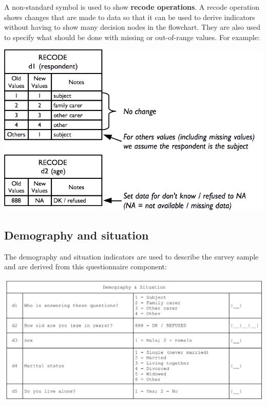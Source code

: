 \documentclass[12pt,a4paper]{book}
\theoremstyle{definition}
\theoremstyle{definition}
\theoremstyle{definition}
\theoremstyle{remark}
\begin{document}
A non-standard symbol is used to show \textbf{recode operations}. A
recode operation shows changes that are made to data so that it can be
used to derive indicators without having to show many decision nodes in
the flowchart. They are also used to specify what should be done with
missing or out-of-range values. For example:

\begin{center}\includegraphics{figures/indicators02} \end{center}

\hypertarget{demography-and-situation}{%
\subsection{Demography and situation}\label{demography-and-situation}}

The demography and situation indicators are used to describe the survey
sample and are derived from this questionnaire component:

\begin{center}\includegraphics{figures/questionnaire01} \end{center}
\end{document}
